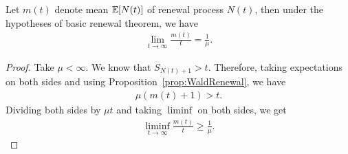 \documentclass[a4paper,10pt, english]{article}
\begin{document}
\begin{thm} Let $m(t)$ denote mean $\mathbb{E}[N(t)]$ of renewal process $N(t)$, then under the hypotheses of basic renewal theorem, we have 
	\begin{align*}
	\lim_{t \to \infty}\frac{m(t)}{t} = \frac{1}{\mu}.
	\end{align*}
\end{thm}
\begin{proof}
	Take $\mu < \infty$. We know that $S_{N(t)+1} > t$. Therefore, taking expectations on both sides and using Proposition~\ref{prop:WaldRenewal}, we have 
	\begin{align*}
	\mu (m(t) + 1) > t.
	\end{align*}
	Dividing both sides by $\mu t$ and taking $\liminf$ on both sides, we get
\begin{align*}
\liminf_{t \to \infty} \frac{m(t)}{t} \geq \frac{1}{\mu}.
\end{align*}
	

\end{proof}
\end{document}
